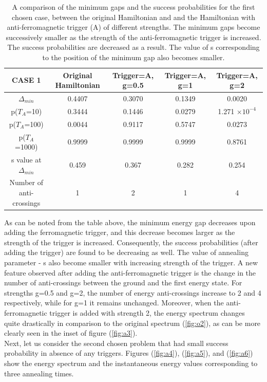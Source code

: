\documentclass[12]{article}
\begin{document}
\begin{table}[H]
\centering
\renewcommand{\arraystretch}{1.5}
\begin{tabular}{|c|c|c|c|c|}
\hline 
CASE 1 & Original Hamiltonian & Trigger=A, g=0.5 & Trigger=A, g=1 & Trigger=A, g=2 \\ 
\hline 
$\Delta_{min}$ & 0.4407 & 0.3070 & 0.1349 & 0.0020 \\ 
\hline 
p($T_A$=10) & 0.3444 & 0.1446 & 0.0279 & 1.271 $\times 10^{-4}$ \\ 
\hline 
p($T_A$=100) & 0.0044 & 0.9117 & 0.5747 & 0.0273 \\ 
\hline 
p($T_A$=1000) & 0.9999 & 0.9999 & 0.9999 & 0.8761 \\ 
\hline 
s value at $\Delta_{min}$ & 0.459 & 0.367 & 0.282 & 0.254 \\ 
\hline
Number of anti-crossings & 1 & 2 & 1 & 4 \\
\hline
\end{tabular} 
\caption{A comparison of the minimum gaps and the success probabilities for the first chosen case, between the original Hamiltonian and and the Hamiltonian with anti-ferromagnetic trigger (A) of different strengths. The minimum gaps become successively smaller as the strength of the anti-ferromagnetic trigger is increased. The success probabilities are decreased as a result. The value of s corresponding to the position of the minimum gap also becomes smaller.}
\label{tab:a1}
\end{table}
As can be noted from the table above, the minimum energy gap decreases upon adding the ferromagnetic trigger, and this decrease becomes larger as the strength of the trigger is increased. Consequently, the success probabilities (after adding the trigger) are found to be decreasing as well. The value of annealing parameter - s also become smaller with increasing strength of the trigger.
A new feature observed after adding the anti-ferromagnetic trigger is the change in the number of anti-crossings between the ground and the first energy state. For strengths g=0.5 and g=2, the number of energy anti-crossings increase to 2 and 4 respectively, while for g=1 it remains unchanged. Moreover, when the anti-ferromagnetic trigger is added with strength 2, the energy spectrum changes quite drastically in comparison to the original spectrum (\ref{fig:o2}), as can be more clearly seen in the inset of figure (\ref{fig:a3}).\\

Next, let us consider the second chosen problem that had small success probability in absence of any triggers. Figures (\ref{fig:a4}), (\ref{fig:a5}), and (\ref{fig:a6}) show the energy spectrum and the instantaneous energy values corresponding to three annealing times. 
\end{document}
